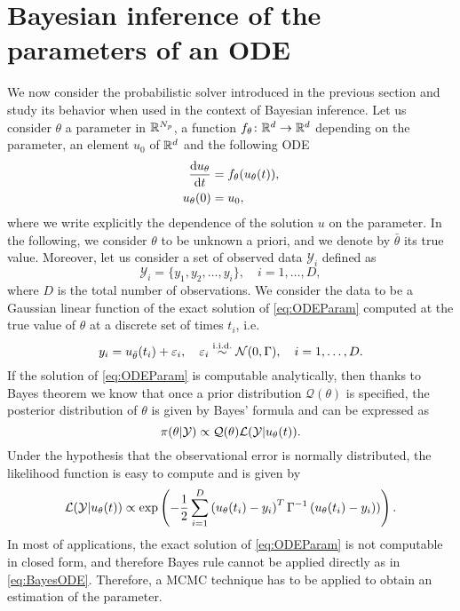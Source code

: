 \section{Bayesian inference of the parameters of an ODE}

We now consider the probabilistic solver introduced in the previous section and study its behavior when used in the context of Bayesian inference. Let us consider $\theta$ a parameter in $\mathbb{R}^{N_p}$, a function $f_\theta\colon \mathbb{R}^d \to \mathbb{R}^d$ depending on the parameter, an element $u_0$ of $\mathbb{R}^d$ and the following ODE 
\begin{equation}\label{eq:ODEParam}
\begin{aligned}
	\dv{u_\theta}{t} (t) &= f_\theta(u_\theta(t)),\\
			 u_\theta(0) &= u_0,
\end{aligned}
\end{equation}
where we write explicitly the dependence of the solution $u$ on the parameter. In the following, we consider $\theta$ to be unknown a priori, and we denote by $\bar \theta$ its true value. Moreover, let us consider a set of observed data $\mathcal{Y}_i$ defined as
\begin{equation}
	\mathcal{Y}_i = \{y_1, y_2, \ldots, y_i\}, \quad i = 1, \ldots, D,
\end{equation} 
where $D$ is the total number of observations. We consider the data to be a Gaussian linear function of the exact solution of \eqref{eq:ODEParam} computed at the true value of $\theta$ at a discrete set of times $t_i$, i.e.
\begin{equation}
	y_i = u_{\bar\theta}(t_i) + \varepsilon_i, \quad \varepsilon_i \stackrel{\text{i.i.d.}}{\sim} \mathcal{N}(0, \Gamma), \quad i = 1, \ldots, D.
\end{equation} 
If the solution of \eqref{eq:ODEParam} is computable analytically, then thanks to Bayes theorem we know that once a prior distribution $\mathcal{Q}(\theta)$ is specified, the posterior distribution of $\theta$ is given by Bayes' formula and can be expressed as
\begin{equation}\label{eq:BayesODE}
	\pi(\theta|\mathcal Y) \propto \mathcal{Q}(\theta) \mathcal{L}(\mathcal Y|u_\theta(t)).
\end{equation}
 Under the hypothesis that the observational error is normally distributed, the likelihood function is easy to compute and is given by
 \begin{equation}\label{eq:likelihood}
	 \mathcal{L}(\mathcal Y|u_\theta(t)) \propto \exp\left(-\frac{1}{2}\sum_{i=1}^{D}\left(u_\theta(t_i) - y_i\right)^T \Gamma^{-1} \left(u_\theta(t_i) - y_i) \right)\right).
 \end{equation}
 In most of applications, the exact solution of \eqref{eq:ODEParam} is not computable in closed form, and therefore Bayes rule cannot be applied directly as in \eqref{eq:BayesODE}. Therefore, a MCMC technique has to be applied to obtain an estimation of the parameter.
 



